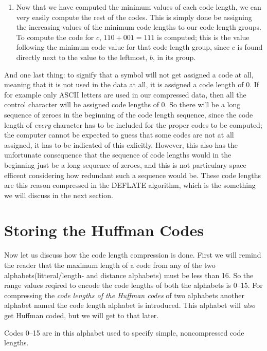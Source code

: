 \begin{enumerate}
  \item Now that we have computed the minimum values of each code
    length, we can very easily compute the rest of the codes. This is
    simply done be assigning the increasing values of the minimum code
    lengths to our code length groups. To compute the code for $c$,
    $110 + 001 = 111$ is computed; this is the value following the
    minimum code value for that code length group, since $c$ is found
    directly next to the value to the leftmost, $b$, in its group.

\end{enumerate}

And one last thing: to signify that a symbol will not get assigned a
code at all, meaning that it is not used in the data at all, it is
assigned a code length of $0$. If for example only ASCII letters are
used in our compressed data, then all the control character will be
assigned code lengths of $0$. So there will be a long sequence of
zeroes in the beginning of the code length sequence, since the code
length of \textit{every} character has to be included for the proper
codes to be computed; the computer cannot be expected to guess that
some codes are not at all assigned, it has to be indicated of this
exlicitly. However, this also has the unfortunate consequence that the
sequence of code lengths would in the beginning just be a long
sequence of zeroes, and this is not particulary space efficent
considering how redundant such a sequence would be. These code lengths
are this reason compressed in the DEFLATE algorithm, which is the
something we will discuss in the next section.

\section{Storing the Huffman Codes}
\label{sec:storing-huffman-codes}

Now let us discuss how the code length compression is done. First we
will remind the reader that the maximum length of a code from any of
the two alphabets(litteral/length- and distance alphabets) must be
less than 16. So the range values reqired to encode the code lengths
of both the alphabets is 0--15. For compressing the \textit{code
  lengths of the Huffman codes} of two alphabets another alphabet
named the code length alphabet is introduced. This alphabet will
\textit{also} get Huffman coded, but we will get to that later.

Codes 0--15 are in this alphabet used to specify simple,
noncompressed code lengths.

